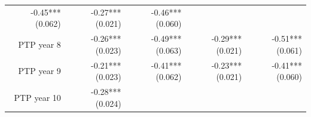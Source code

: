 \documentclass[]{article}
\begin{document}
\begin{longtable}[c]{@{}rrrrr@{}}
\begin{minipage}[t]{0.16\columnwidth}
-0.45*** (0.062)
\strut\end{minipage} &
\begin{minipage}[t]{0.21\columnwidth}\raggedleft\strut
-0.27*** (0.021)
\strut\end{minipage} &
\begin{minipage}[t]{0.15\columnwidth}\raggedleft\strut
-0.46*** (0.060)
\strut\end{minipage}\tabularnewline
\begin{minipage}[t]{0.17\columnwidth}\raggedleft\strut
PTP year 8
\strut\end{minipage} &
\begin{minipage}[t]{0.18\columnwidth}\raggedleft\strut
-0.26*** (0.023)
\strut\end{minipage} &
\begin{minipage}[t]{0.16\columnwidth}\raggedleft\strut
-0.49*** (0.063)
\strut\end{minipage} &
\begin{minipage}[t]{0.21\columnwidth}\raggedleft\strut
-0.29*** (0.021)
\strut\end{minipage} &
\begin{minipage}[t]{0.15\columnwidth}\raggedleft\strut
-0.51*** (0.061)
\strut\end{minipage}\tabularnewline
\begin{minipage}[t]{0.17\columnwidth}\raggedleft\strut
PTP year 9
\strut\end{minipage} &
\begin{minipage}[t]{0.18\columnwidth}\raggedleft\strut
-0.21*** (0.023)
\strut\end{minipage} &
\begin{minipage}[t]{0.16\columnwidth}\raggedleft\strut
-0.41*** (0.062)
\strut\end{minipage} &
\begin{minipage}[t]{0.21\columnwidth}\raggedleft\strut
-0.23*** (0.021)
\strut\end{minipage} &
\begin{minipage}[t]{0.15\columnwidth}\raggedleft\strut
-0.41*** (0.060)
\strut\end{minipage}\tabularnewline
\begin{minipage}[t]{0.17\columnwidth}\raggedleft\strut
PTP year 10
\strut\end{minipage} &
\begin{minipage}[t]{0.18\columnwidth}\raggedleft\strut
-0.28*** (0.024)
\strut\end{minipage} &
\begin{minipage}[t]{0.16\columnwidth}\raggedleft\strut

\end{minipage}
\end{longtable}
\end{document}
